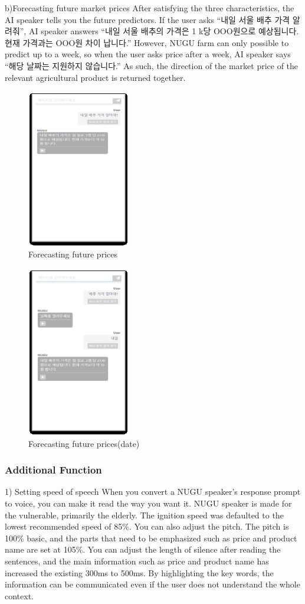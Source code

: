 \documentclass[conference]{IEEEtran}
\begin{document}
b)Forecasting future market prices
After satisfying the three characteristics, the AI speaker tells you the future predictors. If the user asks “내일 서울 배추 가격 알려줘”, AI speaker answers “내일 서울 배추의 가격은 1 k당 OOO원으로 예상됩니다. 현재 가격과는 OOO원 차이 납니다.” However, NUGU farm can only possible to predict up to a week, so when the user asks price after a week, AI speaker says “해당 날짜는 지원하지 않습니다.” As such, the direction of the market price of the relevant agricultural product is returned together.

\begin{figure}[h]
\centering
    \includegraphics[width =4.5cm]{1-4.eps}
    \hfil
\caption{ Forecasting future prices}
\end{figure}

\begin{figure}[h]
\centering
    \includegraphics[width =4.5cm]{1-5.eps}
    \hfil
\caption{ Forecasting future prices(date) }
\end{figure}
\newpage
\subsubsection{Additional Function}
1) Setting speed of speech
When you convert a NUGU speaker's response prompt to voice, you can make it read the way you want it. NUGU speaker is made for the vulnerable, primarily the elderly. The ignition speed was defaulted to the lowest recommended speed of 85\%. You can also adjust the pitch. The pitch is 100\% basic, and the parts that need to be emphasized such as price and product name are set at 105\%. You can adjust the length of silence after reading the sentences, and the main information such as price and product name has increased the existing 300ms to 500ms. By highlighting the key words, the information can be communicated even if the user does not understand the whole context.
\end{document}
